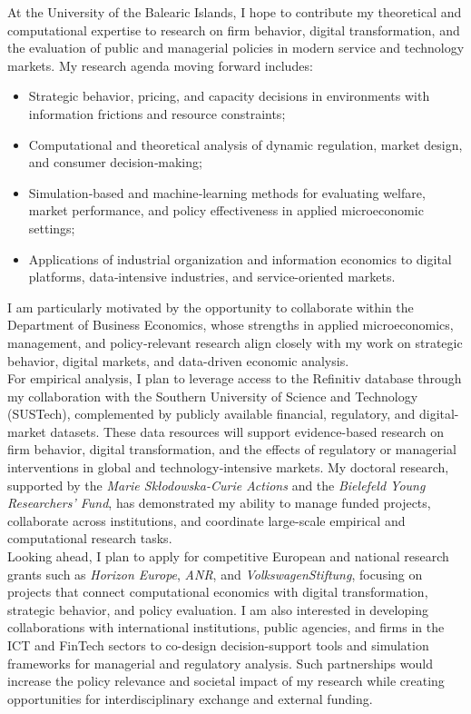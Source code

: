 \documentclass{nfr}
\begin{document}
At the University of the Balearic Islands, I hope to contribute my theoretical and computational expertise to research on firm behavior, digital transformation, and the evaluation of public and managerial policies in modern service and technology markets. 
My research agenda moving forward includes:
\begin{itemize}
    \item Strategic behavior, pricing, and capacity decisions in environments with information frictions and resource constraints;
    \item Computational and theoretical analysis of dynamic regulation, market design, and consumer decision‐making;
    \item Simulation‐based and machine‐learning methods for evaluating welfare, market performance, and policy effectiveness in applied microeconomic settings;
    \item Applications of industrial organization and information economics to digital platforms, data‐intensive industries, and service-oriented markets.
\end{itemize}
I am particularly motivated by the opportunity to collaborate within the Department of Business Economics, whose strengths in applied microeconomics, management, and policy‐relevant research align closely with my work on strategic behavior, digital markets, and data-driven economic analysis.\\

For empirical analysis, I plan to leverage access to the Refinitiv database through my collaboration with the Southern University of Science and Technology (SUSTech), complemented by publicly available financial, regulatory, and digital-market datasets. 
These data resources will support evidence-based research on firm behavior, digital transformation, and the effects of regulatory or managerial interventions in global and technology‐intensive markets. 
My doctoral research, supported by the \textit{Marie Skłodowska-Curie Actions} and the \textit{Bielefeld Young Researchers’ Fund}, has demonstrated my ability to manage funded projects, collaborate across institutions, and coordinate large-scale empirical and computational research tasks.\\

Looking ahead, I plan to apply for competitive European and national research grants such as \textit{Horizon Europe}, \textit{ANR}, and \textit{VolkswagenStiftung}, focusing on projects that connect computational economics with digital transformation, strategic behavior, and policy evaluation. 
I am also interested in developing collaborations with international institutions, public agencies, and firms in the ICT and FinTech sectors to co-design decision-support tools and simulation frameworks for managerial and regulatory analysis. 
Such partnerships would increase the policy relevance and societal impact of my research while creating opportunities for interdisciplinary exchange and external funding.\\
\end{document}
